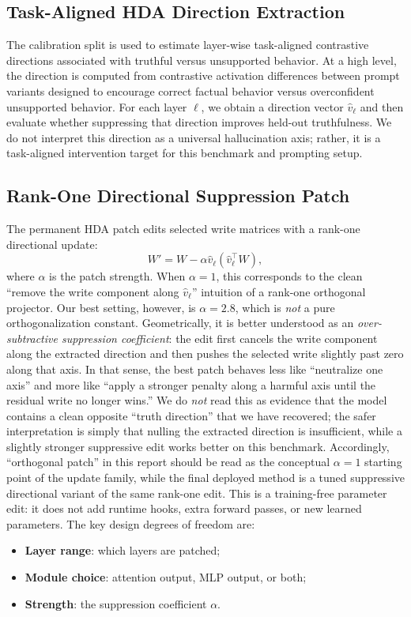 \documentclass{article}
\begin{document}
\subsection{Task-Aligned HDA Direction Extraction}
The calibration split is used to estimate layer-wise task-aligned contrastive directions associated with truthful versus unsupported behavior. At a high level, the direction is computed from contrastive activation differences between prompt variants designed to encourage correct factual behavior versus overconfident unsupported behavior. For each layer $\ell$, we obtain a direction vector $\hat{v}_\ell$ and then evaluate whether suppressing that direction improves held-out truthfulness. We do not interpret this direction as a universal hallucination axis; rather, it is a task-aligned intervention target for this benchmark and prompting setup.

\subsection{Rank-One Directional Suppression Patch}
The permanent HDA patch edits selected write matrices with a rank-one directional update:
\[
W' = W - \alpha \hat{v}_\ell (\hat{v}_\ell^\top W),
\]
where $\alpha$ is the patch strength. When $\alpha = 1$, this corresponds to the clean ``remove the write component along $\hat{v}_\ell$'' intuition of a rank-one orthogonal projector. Our best setting, however, is $\alpha = 2.8$, which is \emph{not} a pure orthogonalization constant. Geometrically, it is better understood as an \emph{over-subtractive suppression coefficient}: the edit first cancels the write component along the extracted direction and then pushes the selected write slightly past zero along that axis. In that sense, the best patch behaves less like ``neutralize one axis'' and more like ``apply a stronger penalty along a harmful axis until the residual write no longer wins.'' We do \emph{not} read this as evidence that the model contains a clean opposite ``truth direction'' that we have recovered; the safer interpretation is simply that nulling the extracted direction is insufficient, while a slightly stronger suppressive edit works better on this benchmark. Accordingly, ``orthogonal patch'' in this report should be read as the conceptual $\alpha = 1$ starting point of the update family, while the final deployed method is a tuned suppressive directional variant of the same rank-one edit. This is a training-free parameter edit: it does not add runtime hooks, extra forward passes, or new learned parameters. The key design degrees of freedom are:
\begin{itemize}
\item \textbf{Layer range}: which layers are patched;
\item \textbf{Module choice}: attention output, MLP output, or both;
\item \textbf{Strength}: the suppression coefficient $\alpha$.
\end{itemize}
\end{document}
